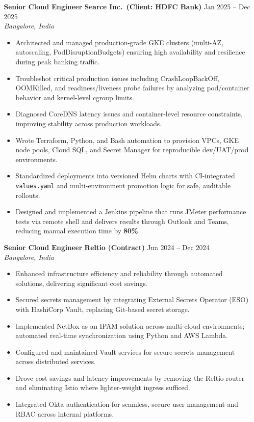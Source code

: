 \documentclass[letterpaper,10.5pt]{article}
\newcommand{\role}[4]{%
  \noindent\textbf{#1} \textbar{} \textbf{#2} \hfill #3\\
  \textit{#4}\vspace{2pt}
}
\begin{document}
\role{Senior Cloud Engineer}{Searce Inc.\ (Client: HDFC Bank)}{Jan 2025 -- Dec 2025}{Bangalore, India}
\begin{itemize}
    \item Architected and managed production-grade GKE clusters (multi-AZ, autoscaling, PodDisruptionBudgets) ensuring high availability and resilience during peak banking traffic.
    \item Troubleshot critical production issues including CrashLoopBackOff, OOMKilled, and readiness/liveness probe failures by analyzing pod/container behavior and kernel-level cgroup limits.
    \item Diagnosed CoreDNS latency issues and container-level resource constraints, improving stability across production workloads.
    \item Wrote Terraform, Python, and Bash automation to provision VPCs, GKE node pools, Cloud SQL, and Secret Manager for reproducible dev/UAT/prod environments.
    \item Standardized deployments into versioned Helm charts with CI-integrated \texttt{values.yaml} and multi-environment promotion logic for safe, auditable rollouts.
    \item Designed and implemented a Jenkins pipeline that runs JMeter performance tests via remote shell and delivers results through Outlook and Teams, reducing manual execution time by \textbf{80\%}.
\end{itemize}

\role{Senior Cloud Engineer}{Reltio (Contract)}{Jun 2024 -- Dec 2024}{Bangalore, India}
\begin{itemize}
    \item Enhanced infrastructure efficiency and reliability through automated solutions, delivering significant cost savings.
    \item Secured secrets management by integrating External Secrets Operator (ESO) with HashiCorp Vault, replacing Git-based secret storage.
    \item Implemented NetBox as an IPAM solution across multi-cloud environments; automated real-time synchronization using Python and AWS Lambda.
    \item Configured and maintained Vault services for secure secrets management across distributed services.
    \item Drove cost savings and latency improvements by removing the Reltio router and eliminating Istio where lighter-weight ingress sufficed.
    \item Integrated Okta authentication for seamless, secure user management and RBAC across internal platforms.
\end{itemize}
\end{document}
